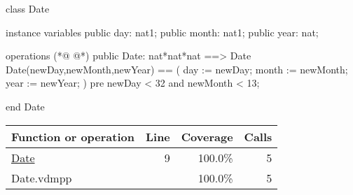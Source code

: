 \begin{vdmpp}[breaklines=true]
class Date

instance variables
public day: nat1;
public month: nat1;
public year: nat;

operations
(*@
\label{Date:9}
@*)
public Date: nat*nat*nat ==> Date
 Date(newDay,newMonth,newYear) == (
  day := newDay;
  month := newMonth;
  year := newYear;
 )
 pre newDay < 32 and newMonth < 13;
 
end Date
\end{vdmpp}
\bigskip
\begin{longtable}{|l|r|r|r|}
\hline
Function or operation & Line & Coverage & Calls \\
\hline
\hline
\hyperref[Date:9]{Date} & 9&100.0\% & 5 \\
\hline
\hline
Date.vdmpp & & 100.0\% & 5 \\
\hline
\end{longtable}


